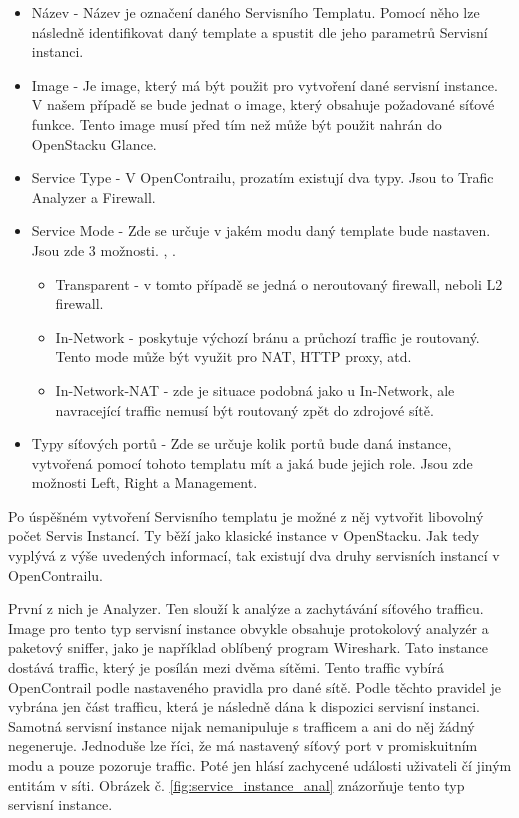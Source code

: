\begin{itemize}
\item Název - Název je označení daného Servisního Templatu. Pomocí něho lze následně identifikovat daný template a spustit dle jeho parametrů Servisní instanci. 
\item Image - Je image, který má být použit pro vytvoření dané servisní instance. V našem případě se bude jednat o image, který obsahuje požadované síťové funkce. Tento image musí před tím než může být použit  nahrán do OpenStacku Glance.
\item Service Type - V OpenContrailu, prozatím existují dva typy. Jsou to Trafic Analyzer a Firewall.
\item Service Mode - Zde se určuje v jakém modu daný template bude nastaven. Jsou zde 3 možnosti. , .

	\begin{itemize}
	\item Transparent - v tomto případě se jedná o neroutovaný firewall, neboli L2 firewall.
	\item In-Network - poskytuje výchozí bránu a průchozí traffic je routovaný. Tento mode může být využit pro NAT, HTTP proxy, atd.
	\item In-Network-NAT - zde je situace podobná jako u In-Network, ale navracející traffic nemusí být routovaný zpět do zdrojové sítě.
	\end{itemize}

\item Typy síťových portů - Zde se určuje kolik portů bude daná instance, vytvořená pomocí tohoto templatu mít a jaká bude jejich role. Jsou zde možnosti Left, Right a Management. 
\end{itemize}

Po úspěšném vytvoření Servisního templatu je možné z něj vytvořit libovolný počet Servis Instancí.  Ty běží jako klasické instance v OpenStacku. Jak tedy vyplývá z výše uvedených informací, tak existují dva druhy servisních instancí v OpenContrailu. 

První z nich je Analyzer. Ten slouží k analýze a zachytávání síťového trafficu. Image pro tento typ servisní instance obvykle obsahuje protokolový analyzér a paketový sniffer, jako je například oblíbený program Wireshark. Tato instance dostává traffic, který je posílán mezi dvěma sítěmi. Tento traffic vybírá OpenContrail podle nastaveného pravidla pro dané sítě. Podle těchto pravidel je vybrána jen část trafficu, která je následně dána k dispozici servisní instanci. Samotná servisní instance nijak nemanipuluje s trafficem a ani do něj žádný negeneruje. Jednoduše lze říci, že má nastavený síťový port v promiskuitním modu a pouze pozoruje traffic. Poté jen hlásí zachycené události uživateli čí jiným entitám v síti. Obrázek č. \ref{fig:service_instance_anal} znázorňuje tento typ servisní instance.

